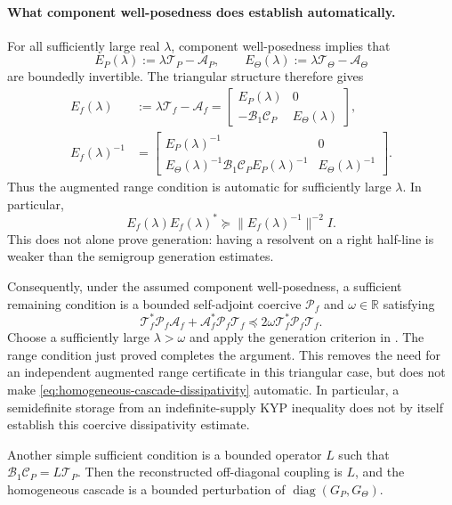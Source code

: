 \documentclass[11pt,a4paper]{article}
\begin{document}
\paragraph{What component well-posedness does establish automatically.}
For all sufficiently large real $\lambda$, component well-posedness
implies that
\[
 E_P(\lambda):=\lambda\mathcal T_P-\mathcal A_P,
 \qquad
 E_\Theta(\lambda):=\lambda\mathcal T_\Theta-\mathcal A_\Theta
\]
are boundedly invertible. The triangular structure therefore gives
\begin{align*}
 E_f(\lambda)&:=\lambda\mathcal T_f-\mathcal A_f
 =\begin{bmatrix}E_P(\lambda)&0\\
 -\mathcal B_1\mathcal C_P&E_\Theta(\lambda)\end{bmatrix},\\
 E_f(\lambda)^{-1}
 &=\begin{bmatrix}
 E_P(\lambda)^{-1}&0\\
 E_\Theta(\lambda)^{-1}\mathcal B_1\mathcal C_P E_P(\lambda)^{-1}
 &E_\Theta(\lambda)^{-1}
 \end{bmatrix}.
\end{align*}
Thus the augmented range condition is automatic for sufficiently large
$\lambda$. In particular,
\[
 E_f(\lambda)E_f(\lambda)^*
 \succeq\|E_f(\lambda)^{-1}\|^{-2}I.
\]
This does not alone prove generation: having a resolvent on a right
half-line is weaker than the semigroup generation estimates.

Consequently, under the assumed component well-posedness, a sufficient
remaining condition is a bounded self-adjoint coercive $\mathcal P_f$
and $\omega\in\mathbb R$ satisfying
\begin{equation}\label{eq:homogeneous-cascade-dissipativity}
 \mathcal T_f^*\mathcal P_f\mathcal A_f
 +\mathcal A_f^*\mathcal P_f\mathcal T_f
 \preceq2\omega\mathcal T_f^*\mathcal P_f\mathcal T_f.
\end{equation}
Choose a sufficiently large $\lambda>\omega$ and apply the generation
criterion in \cite{jagt}. The range condition just proved completes the
argument. This removes the need for an independent augmented range
certificate in this triangular case, but does not make
\eqref{eq:homogeneous-cascade-dissipativity} automatic. In particular,
a semidefinite storage from an indefinite-supply KYP inequality does
not by itself establish this coercive dissipativity estimate.

Another simple sufficient condition is a bounded operator $L$ such that
$\mathcal B_1\mathcal C_P=L\mathcal T_P$. Then the reconstructed
off-diagonal coupling is $L$, and the homogeneous cascade is a bounded
perturbation of $\operatorname{diag}(G_P,G_\Theta)$.
\end{document}
